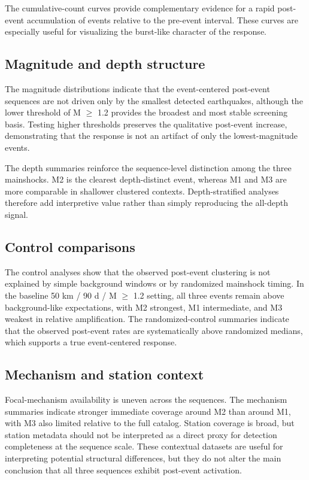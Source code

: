 \documentclass[11pt]{article}
\begin{document}
The cumulative-count curves provide complementary evidence for a rapid post-event accumulation of events relative to the pre-event interval. These curves are especially useful for visualizing the burst-like character of the response.

\subsection{Magnitude and depth structure}
The magnitude distributions indicate that the event-centered post-event sequences are not driven only by the smallest detected earthquakes, although the lower threshold of M $\geq$ 1.2 provides the broadest and most stable screening basis. Testing higher thresholds preserves the qualitative post-event increase, demonstrating that the response is not an artifact of only the lowest-magnitude events.

The depth summaries reinforce the sequence-level distinction among the three mainshocks. M2 is the clearest depth-distinct event, whereas M1 and M3 are more comparable in shallower clustered contexts. Depth-stratified analyses therefore add interpretive value rather than simply reproducing the all-depth signal.

\subsection{Control comparisons}
The control analyses show that the observed post-event clustering is not explained by simple background windows or by randomized mainshock timing. In the baseline 50 km / 90 d / M $\geq$ 1.2 setting, all three events remain above background-like expectations, with M2 strongest, M1 intermediate, and M3 weakest in relative amplification. The randomized-control summaries indicate that the observed post-event rates are systematically above randomized medians, which supports a true event-centered response.

\subsection{Mechanism and station context}
Focal-mechanism availability is uneven across the sequences. The mechanism summaries indicate stronger immediate coverage around M2 than around M1, with M3 also limited relative to the full catalog. Station coverage is broad, but station metadata should not be interpreted as a direct proxy for detection completeness at the sequence scale. These contextual datasets are useful for interpreting potential structural differences, but they do not alter the main conclusion that all three sequences exhibit post-event activation.
\end{document}
